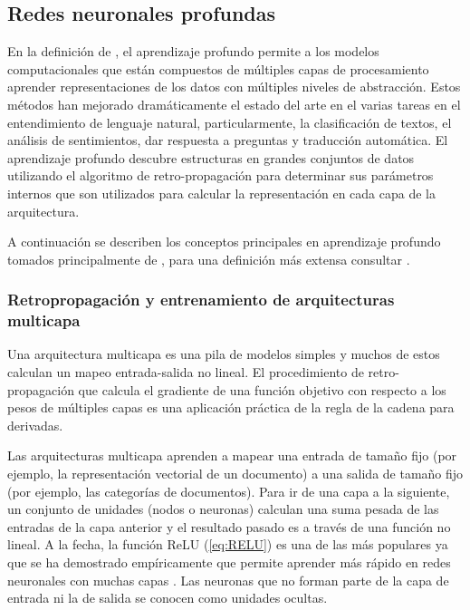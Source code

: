 \subsection{Redes neuronales profundas}

En la definición de \citep{lecun2015deep}, el aprendizaje profundo permite a los modelos computacionales que están compuestos de múltiples capas de procesamiento aprender representaciones de los datos con múltiples niveles de abstracción. Estos métodos han mejorado dramáticamente el estado del arte en el varias tareas en el entendimiento de lenguaje natural, particularmente, la clasificación de textos, el  análisis de sentimientos, dar respuesta a preguntas y traducción automática. El aprendizaje profundo descubre estructuras en grandes conjuntos de datos utilizando el algoritmo de retro-propagación para determinar sus parámetros internos que son utilizados para calcular la representación en cada capa de la arquitectura.

A continuación se describen los conceptos principales en aprendizaje profundo tomados principalmente de \citep{lecun2015deep}, para una definición más extensa consultar \citep{goodfellow2016deep, kamath2019deep}.

\subsubsection{Retropropagación y entrenamiento de arquitecturas multicapa}

Una arquitectura multicapa es una pila de modelos simples y muchos de estos calculan un mapeo entrada-salida no lineal. El procedimiento de retro-propagación que calcula el gradiente de una función objetivo con respecto a los pesos de múltiples capas es una aplicación práctica de la regla de la cadena para derivadas.

Las arquitecturas multicapa aprenden a mapear una entrada de tamaño fijo (por ejemplo, la representación vectorial de un documento) a una salida de tamaño fijo (por ejemplo, las categorías de documentos). Para ir de una capa a la siguiente, un conjunto de unidades (nodos o neuronas) calculan una suma pesada de las entradas de la capa anterior y el resultado pasado es a través de una función no lineal. A la fecha, la función ReLU (\ref{eq:RELU})  es una de las más populares ya que se ha demostrado empíricamente que permite aprender más rápido en redes neuronales con muchas capas \citep{glorot2011deep}. Las neuronas que no forman parte de la capa de entrada ni la de salida se conocen como unidades ocultas. 

